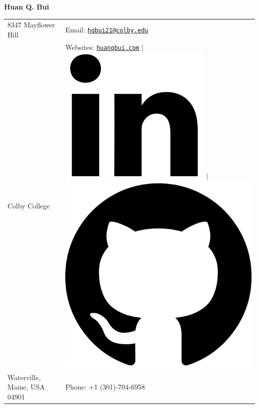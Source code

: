 \documentclass[10pt]{article}
\begin{document}
\noindent  
\begin{center}
{\Huge{\textbf{Huan Q. Bui}}}
\end{center}
\vspace{-10pt}
\hrulefill
\vspace{-1ex}

\normalsize


\begin{center}
\begin{tabular}{l l}
     8347 Mayflower Hill 		 & \hspace{1in} Email: \href{mailto:hqbui21@colby.edu}{\texttt{hqbui21@colby.edu}} \\
     Colby College 				 & \hspace{1in}  Websites: \href{www.huanqbui.com}{\texttt{huanqbui.com}} $\vert$ 					\href{https://www.linkedin.com/in/huan-bui/}{\includegraphics[scale=0.04]{linkedin_logo.PNG}} $\vert$ \href{https://github.com/huanium/huanium}{\includegraphics[scale=0.02]{GitHub-Mark.PNG}}\\
 	Waterville, Maine, USA 04901 & \hspace{1in} Phone: +1 (301)-704-6958\\
\end{tabular}
\end{center}
\end{document}
